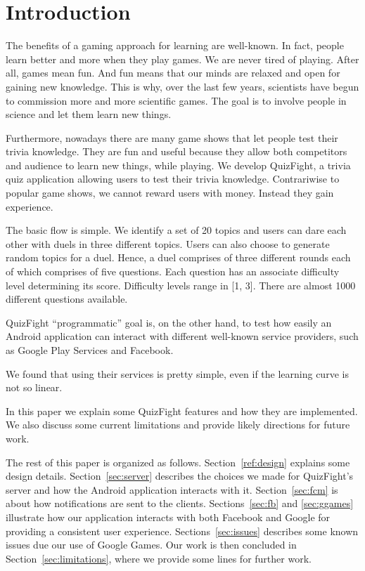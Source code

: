 \section{Introduction}

The benefits of a gaming approach for learning are well-known. In fact,
people learn better and more when they play games. We are never tired of
playing.
After all, games mean fun. And fun means that our minds are relaxed and open
for gaining new knowledge.
This is why, over the last few years, scientists have begun to commission
more and more scientific games.
The goal is to involve people in science and let them learn new things.

Furthermore, nowadays there are many game shows that let people test their
trivia knowledge.
They are fun and useful because they allow both competitors and audience to
learn new things, while playing.
We develop QuizFight, a trivia quiz application allowing users to test their
trivia knowledge.
Contrariwise to popular game shows, we cannot reward users with money.
Instead they gain experience. 

The basic flow is simple. We identify a set of 20 topics and users can
dare each other with duels in three different topics.
Users can also choose to generate random topics for a duel.
Hence, a duel comprises of three different rounds each of which comprises
of five questions.
Each question has an associate difficulty level determining its score.
Difficulty levels range in [1, 3].
There are almost 1000 different questions available.

QuizFight ``programmatic'' goal is, on the other hand, to test how easily an
Android application can interact with different well-known service providers,
such as Google Play Services and Facebook.

We found that using their services is pretty simple, even if the learning curve
is not so linear.

In this paper we explain some QuizFight features and how they are
implemented.
We also discuss some current limitations and provide likely directions for
future work. 

The rest of this paper is organized as follows. Section~\ref{ref:design} explains
some design details. Section~\ref{sec:server} describes the choices we made for
QuizFight's server and how the Android application interacts with it. 
Section~\ref{sec:fcm} is about how notifications are sent to the clients.
Sections~\ref{sec:fb} and \ref{sec:ggames} illustrate how our application
interacts with both Facebook and Google for providing a consistent user
experience. Sections~\ref{sec:issues} describes some known issues due 
our use of Google Games. Our work is then concluded in Section~\ref{sec:limitations},
where we provide some lines for further work.
